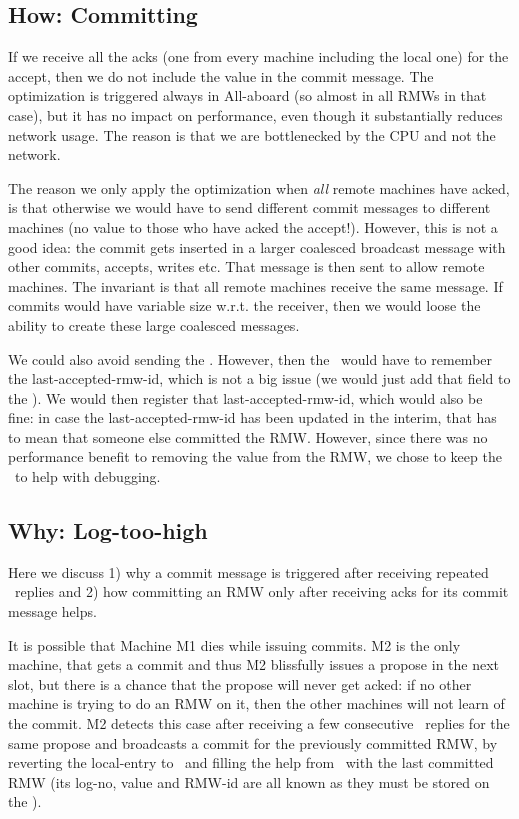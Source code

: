 \subsection{How: Committing} \label{sec:how:commits}

If we receive all the acks (one from every machine including the local one) for the accept, then we do not include the value in the commit message.
The optimization is triggered always in All-aboard (so almost in all RMWs in that case), but it has no impact on performance, even though it substantially reduces network usage. The reason is that we are bottlenecked by the CPU and not the network.

The reason we only apply the optimization when \emph{all} remote machines have acked, is that otherwise we would have to send different commit messages to different machines (no value to those who have acked the accept!). However, this is not a good idea: the commit gets inserted in a larger coalesced broadcast message with other commits, accepts, writes etc. That message is then sent to allow remote machines. The invariant is that all remote machines receive the same message. If commits would have variable size w.r.t. the receiver, then we would loose the ability to create these large coalesced messages.

We could also avoid sending the \rmw. However, then the \kv~would have to remember the last-accepted-rmw-id, which is not a big issue (we would just add that field to the \kv). We would then register that last-accepted-rmw-id, which would also be fine: 
in case the last-accepted-rmw-id has been updated in the interim, that has to mean that someone else committed the RMW. However, since there was no performance benefit to removing the value from the RMW, we chose to keep the \rmw~to help with debugging.


\subsection{Why: Log-too-high}\label{sec:loghigh}
Here we discuss 1) why a commit message is triggered after receiving repeated \loghigh~replies and 2) how committing an RMW only after receiving acks for its commit message helps.

It is possible that Machine M1 dies while issuing commits.
M2 is the only machine, that gets a commit and thus M2 blissfully issues a propose in the next slot, but there is a chance that the propose will never get acked: if no other machine is trying to do an RMW on it, then the other machines will not learn of the commit. M2 detects this case after receiving a few consecutive \loghigh~replies for the same propose and broadcasts a commit for the previously committed RMW, by reverting the local-entry to \bcasthelp~and filling the help from \kv~with the last committed RMW (its log-no, value and RMW-id are all known as they must be stored on the \kv).

